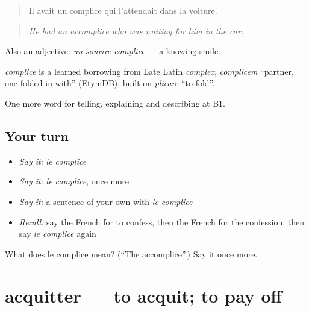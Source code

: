 \begin{quote}
Il avait un complice qui l'attendait dans la voiture.
\end{quote}

\begin{quote}
\emph{He had an accomplice who was waiting for him in the car.}
\end{quote}

Also an adjective: \emph{un sourire complice} — a knowing smile.

\begin{cousinweb}
\emph{complice} is a learned borrowing from Late Latin \emph{complex}, \emph{complicem} \textquotedblleft{}partner, one folded in with\textquotedblright{} (EtymDB), built on \emph{plicāre} \textquotedblleft{}to fold\textquotedblright{}.
\end{cousinweb}

\begin{grammarlens}[title={What you've built}]
One more word for telling, explaining and describing at B1.
\end{grammarlens}

\subsection*{Your turn}
\begin{itemize}
\raggedright
  \item \emph{Say it:} \emph{le complice}
  \item \emph{Say it:} \emph{le complice}, once more
  \item \emph{Say it:} a sentence of your own with \emph{le complice}
  \item \emph{Recall:} say the French for to confess, then the French for the confession, then say \emph{le complice} again
\end{itemize}

\begin{tcolorbox}[breakable,colback=teal!4,colframe=teal!35!black,title={Before you move on}]
What does le complice mean? (\textquotedblleft{}The accomplice\textquotedblright{}.) Say it once more.
\end{tcolorbox}
\section[acquitter]{acquitter — to acquit; to pay off}

\label{lesson:FR-C295-acquitter}



